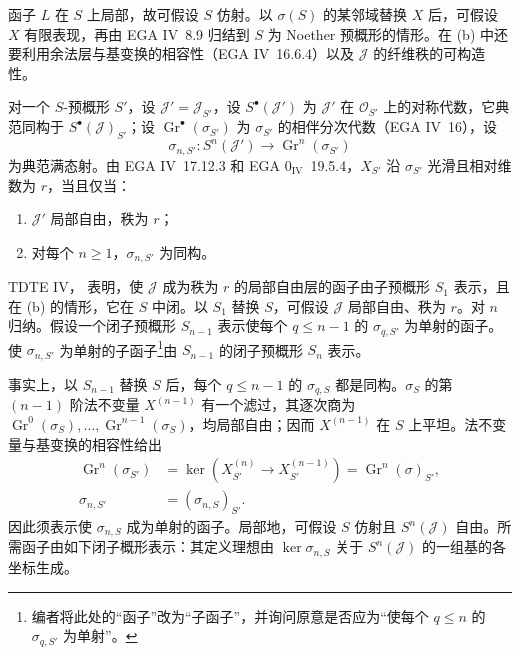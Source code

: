 函子 \(L\) 在 \(S\) 上局部，故可假设 \(S\) 仿射。以 \(\sigma(S)\) 的某邻域替换 \(X\) 后，可假设 \(X\) 有限表现，再由 EGA IV~8.9 归结到 \(S\) 为 Noether 预概形的情形。在 (b) 中还要利用余法层与基变换的相容性（EGA IV~16.6.4）以及 \(\mathcal J\) 的纤维秩的可构造性。

对一个 \(S\)-预概形 \(S'\)，设 \(\mathcal J'=\mathcal J_{S'}\)，设 \(S^\bullet(\mathcal J')\) 为 \(\mathcal J'\) 在 \(\mathcal O_{S'}\) 上的对称代数，它典范同构于 \(S^\bullet(\mathcal J)_{S'}\)；设 \(\operatorname{Gr}^\bullet(\sigma_{S'})\) 为 \(\sigma_{S'}\) 的相伴分次代数（EGA IV~16），设
\[
 \sigma_{n,S'}:S^n(\mathcal J')
 \longrightarrow\operatorname{Gr}^n(\sigma_{S'})
\]
为典范满态射。由 EGA IV~17.12.3 和 EGA \(0_{\mathrm{IV}}\)~19.5.4，\(X_{S'}\) 沿 \(\sigma_{S'}\) 光滑且相对维数为 \(r\)，当且仅当：
\begin{enumerate}
\renewcommand{\labelenumi}{\textup{\roman{enumi})}}
\item \(\mathcal J'\) 局部自由，秩为 \(r\)；
\item 对每个 \(n\geq1\)，\(\sigma_{n,S'}\) 为同构。
\end{enumerate}

TDTE IV， 表明，使 \(\mathcal J\) 成为秩为 \(r\) 的局部自由层的函子由子预概形 \(S_1\) 表示，且在 (b) 的情形，它在 \(S\) 中闭。以 \(S_1\) 替换 \(S\)，可假设 \(\mathcal J\) 局部自由、秩为 \(r\)。对 \(n\) 归纳。假设一个闭子预概形 \(S_{n-1}\) 表示使每个 \(q\leq n-1\) 的 \(\sigma_{q,S'}\) 为单射的函子。使 \(\sigma_{n,S'}\) 为单射的子函子\footnote{编者将此处的“函子”改为“子函子”，并询问原意是否应为“使每个 \(q\leq n\) 的 \(\sigma_{q,S'}\) 为单射”。}由 \(S_{n-1}\) 的闭子预概形 \(S_n\) 表示。

事实上，以 \(S_{n-1}\) 替换 \(S\) 后，每个 \(q\leq n-1\) 的 \(\sigma_{q,S}\) 都是同构。\(\sigma_S\) 的第 \((n-1)\) 阶法不变量 \(X^{(n-1)}\) 有一个滤过，其逐次商为 \(\operatorname{Gr}^0(\sigma_S),\ldots,
 \operatorname{Gr}^{n-1}(\sigma_S)\)，均局部自由；因而 \(X^{(n-1)}\) 在 \(S\) 上平坦。法不变量与基变换的相容性给出
\[
\begin{aligned}
\operatorname{Gr}^n(\sigma_{S'})
 &=\ker\!\left(X_{S'}^{(n)}\to X_{S'}^{(n-1)}\right)
  =\operatorname{Gr}^n(\sigma)_{S'},\\
\sigma_{n,S'}&=(\sigma_{n,S})_{S'}.
\end{aligned}
\]
因此须表示使 \(\sigma_{n,S}\) 成为单射的函子。局部地，可假设 \(S\) 仿射且 \(S^n(\mathcal J)\) 自由。所需函子由如下闭子概形表示：其定义理想由 \(\ker\sigma_{n,S}\) 关于 \(S^n(\mathcal J)\) 的一组基的各坐标生成。


